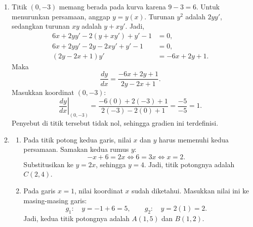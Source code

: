\documentclass[10pt,letterpaper]{article}
\begin{document}
\begin{enumerate}
  \item Titik $(0,-3)$ memang berada pada kurva karena $9-3=6$.
        Untuk menurunkan persamaan, anggap $y=y(x)$.
        Turunan $y^2$ adalah $2yy'$, sedangkan turunan $xy$ adalah $y+xy'$.
        Jadi,
        \begin{align*}
          6x+2yy'-2(y+xy')+y'-1 & =0,        \\
          6x+2yy'-2y-2xy'+y'-1  & =0,        \\
          (2y-2x+1)y'           & =-6x+2y+1.
        \end{align*}
        Maka
        \[
          \frac{dy}{dx}=\frac{-6x+2y+1}{2y-2x+1}.
        \]
        Masukkan koordinat $(0,-3)$:
        \[
          \left.\frac{dy}{dx}\right|_{(0,-3)}
          =\frac{-6(0)+2(-3)+1}{2(-3)-2(0)+1}
          =\frac{-5}{-5}=\boxed{1}.
        \]
        Penyebut di titik tersebut tidak nol, sehingga gradien ini terdefinisi.

        \newpage

  \item \begin{enumerate}
          \item Pada titik potong kedua garis, nilai $x$ dan $y$ harus memenuhi kedua persamaan.
                Samakan kedua rumus $y$:
                \[
                  -x+6=2x\iff6=3x\iff x=2.
                \]
                Substitusikan ke $y=2x$, sehingga $y=4$.
                Jadi, titik potongnya adalah $\boxed{C(2,4)}$.

          \item Pada garis $x=1$, nilai koordinat $x$ sudah diketahui.
                Masukkan nilai ini ke masing-masing garis:
                \[
                  g_1:\quad y=-1+6=5,\qquad
                  g_2:\quad y=2(1)=2.
                \]
                Jadi, kedua titik potongnya adalah $\boxed{A(1,5)}$ dan $\boxed{B(1,2)}$.


\end{enumerate}
\end{enumerate}
\end{document}
